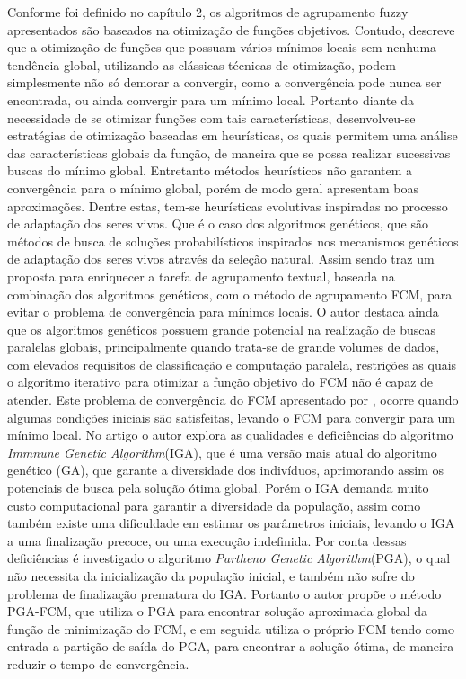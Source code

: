 Conforme foi definido no capítulo 2, os algoritmos de agrupamento fuzzy apresentados são baseados na
otimização de funções objetivos. Contudo, \cite{GasparCunha2012} descreve que a otimização de 
funções que possuam vários mínimos locais
sem nenhuma tendência global, utilizando as clássicas técnicas de otimização, podem simplesmente
não só demorar a convergir, como a convergência pode nunca ser encontrada, ou ainda convergir para
um mínimo local. Portanto diante da necessidade de se otimizar funções com
tais características, desenvolveu-se estratégias de otimização baseadas em heurísticas, os quais
permitem uma análise das características globais da função, de maneira que se possa realizar
sucessivas buscas do mínimo global. Entretanto métodos heurísticos não garantem a convergência para
o mínimo global, porém de modo geral apresentam boas aproximações. Dentre estas, tem-se heurísticas
evolutivas
inspiradas no processo de adaptação dos seres vivos. Que é o caso dos algoritmos
genéticos, que são métodos de busca de soluções probabilísticos inspirados nos mecanismos 
genéticos de adaptação dos seres vivos através da seleção natural. Assim sendo \cite{Jiang2013} 
traz um proposta para enriquecer a tarefa de agrupamento textual, baseada na
combinação dos algoritmos genéticos, com o método de agrupamento FCM, para 
evitar o problema de convergência para mínimos locais. 
O autor destaca ainda que os algoritmos genéticos possuem grande potencial na realização de
buscas paralelas globais, principalmente quando trata-se de grande volumes de dados, com elevados
requisitos de classificação e computação paralela, restrições as quais o algoritmo iterativo para
otimizar a função objetivo do FCM não é capaz de atender.
Este problema de convergência do FCM apresentado por
\cite{Bezdek1984}, ocorre quando algumas condições iniciais são satisfeitas, levando o FCM para 
convergir para um mínimo local. No artigo o autor explora as qualidades e deficiências do algoritmo 
\textit{Immnune Genetic Algorithm}(IGA), que é uma versão mais atual do algoritmo genético (GA),
que garante a diversidade dos indivíduos, aprimorando assim os potenciais de busca pela solução
ótima global. Porém o IGA demanda muito custo computacional para garantir a diversidade da
população, assim como também existe uma dificuldade em estimar os parâmetros iniciais, levando o IGA
a uma finalização precoce, ou uma execução indefinida. Por conta dessas deficiências é investigado
o algoritmo \textit{Partheno Genetic Algorithm}(PGA), o qual não necessita da inicialização da
população inicial, e também não sofre do problema de finalização prematura do IGA. Portanto o autor
propõe o método PGA-FCM, que utiliza o PGA para encontrar solução aproximada global da função de
minimização do FCM, e em seguida utiliza o próprio FCM tendo como entrada a partição de saída do
PGA, para encontrar a solução ótima, de maneira reduzir o tempo de convergência.

